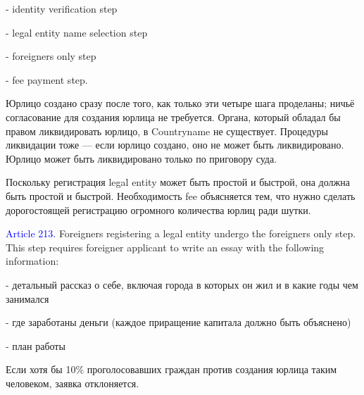 \documentclass[11pt]{article}
\theoremstyle{remark}
\theoremstyle{definition}
\begin{document}
- identity verification step 

- legal entity name selection step

- foreigners only step

- fee payment step.

Юрлицо создано сразу после того, как только эти четыре шага проделаны; ничьё согласование для создания юрлица не требуется. Органа, который обладал бы правом ликвидировать юрлицо, в Countryname не существует. Процедуры ликвидации тоже --- если юрлицо создано, оно не может быть ликвидировано. Юрлицо может быть ликвидировано только по приговору суда.


\color{blue}


Поскольку регистрация legal entity может быть простой и быстрой, она должна быть простой и быстрой. Необходимость fee объясняется тем, что нужно сделать дорогостоящей регистрацию огромного количества юрлиц ради шутки.



\color{black}



\textcolor{blue}{Article 213.} Foreigners registering a legal entity undergo the foreigners only step. This step requires foreigner applicant to write an essay with the following information:

- детальный рассказ о себе, включая города в которых он жил и в какие годы чем занимался

- где заработаны деньги (каждое приращение капитала должно быть объяснено)

- план работы

Если хотя бы 10\% проголосовавших граждан против создания юрлица таким человеком, заявка отклоняется. 

\color{blue}



\end{document}
